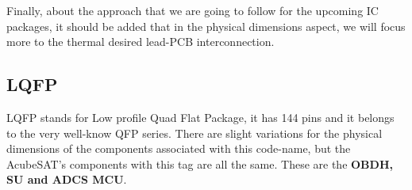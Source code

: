 \documentclass[final]{cubedoc}
\begin{document}
Finally, about the approach that we are going to follow for the upcoming IC packages, it should be added that in the physical dimensions aspect, we will focus more to the thermal desired lead-PCB interconnection. 


\subsection{LQFP}


LQFP stands for Low profile Quad Flat Package, it has 144 pins and it belongs to the very well-know QFP series. There are slight variations for the physical dimensions of the components associated with this code-name, but the AcubeSAT's components with this tag are all the same. These are the \textbf{OBDH, SU and ADCS MCU}.
\end{document}
